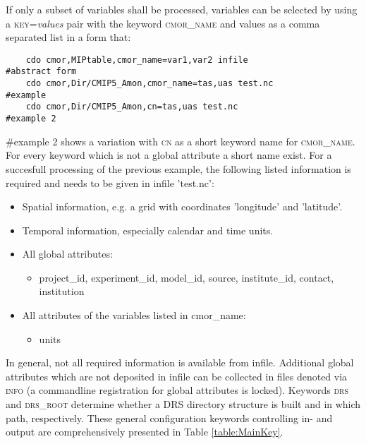 If only a subset of variables shall be processed, variables can be selected by using a  \textsc{key}=\textit{values} pair with the keyword \textsc{cmor\_name} and values as a comma separated list in a form that:

\begin{verbatim}
    cdo cmor,MIPtable,cmor_name=var1,var2 infile                  #abstract form
    cdo cmor,Dir/CMIP5_Amon,cmor_name=tas,uas test.nc             #example
    cdo cmor,Dir/CMIP5_Amon,cn=tas,uas test.nc                    #example 2
\end{verbatim}

\#example 2 shows a variation with \textsc{cn} as a short keyword name for \textsc{cmor\_name}. For every keyword which is not a global attribute a short name exist. For a succesfull processing of the previous example, the following listed information is required and needs to be given in infile 'test.nc':

\begin{itemize}
  \item Spatial information, e.g. a grid with coordinates 'longitude' and 'latitude'.
  \item Temporal information, especially calendar and time units.
  \item All global attributes:
  \begin{itemize}
    \item project\_id, experiment\_id, model\_id, source, institute\_id, contact, institution     
  \end{itemize}
  \item All attributes of the variables listed in cmor\_name:
  \begin{itemize}
    \item units
  \end{itemize}
\end{itemize}

In general, not all required information is available from infile. Additional global attributes which are not deposited in infile can be collected in files denoted via \textsc{info} (a commandline registration for global attributes is locked). Keywords \textsc{drs} and \textsc{drs\_root} determine whether a DRS directory structure is built and in which path, respectively. These general configuration keywords controlling in- and output are comprehensively presented in Table \ref{table:MainKey}.


